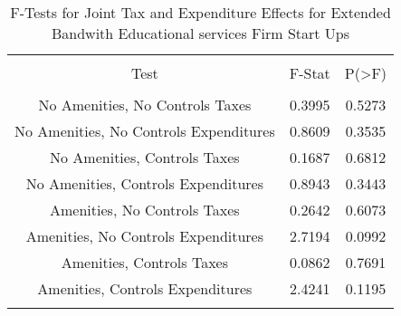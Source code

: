 
\begin{table}[!htbp] \centering 
  \caption{F-Tests for Joint Tax and Expenditure Effects for Extended Bandwith Educational services Firm Start Ups} 
  \label{61Ftests} 
\begin{tabular}{@{\extracolsep{5pt}} ccc} 
\\[-1.8ex]\hline 
\hline \\[-1.8ex] 
Test & F-Stat & P(\textgreater F) \\ 
\hline \\[-1.8ex] 
No Amenities, No Controls Taxes & 0.3995 & 0.5273 \\ 
No Amenities, No Controls Expenditures & 0.8609 & 0.3535 \\ 
No Amenities, Controls Taxes & 0.1687 & 0.6812 \\ 
No Amenities, Controls Expenditures & 0.8943 & 0.3443 \\ 
Amenities, No Controls Taxes & 0.2642 & 0.6073 \\ 
Amenities, No Controls Expenditures & 2.7194 & 0.0992 \\ 
Amenities, Controls Taxes & 0.0862 & 0.7691 \\ 
Amenities, Controls Expenditures & 2.4241 & 0.1195 \\ 
\hline \\[-1.8ex] 
\end{tabular} 
\end{table} 
